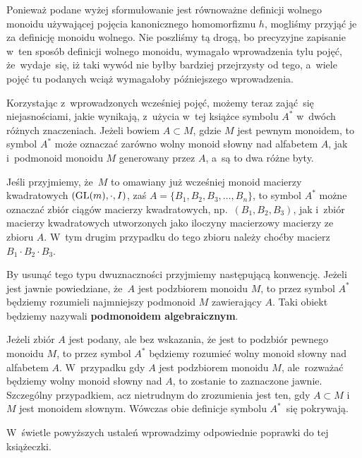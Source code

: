 \documentclass[a4paper,11pt]{article}
\begin{document}
Ponieważ podane wyżej sformułowanie jest równoważne definicji wolnego
monoidu używającej pojęcia kanonicznego homomorfizmu $h$, mogliśmy przyjąć
je za definicję monoidu wolnego. Nie poszliśmy tą drogą, bo precyzyjne
zapisanie w~ten sposób definicji wolnego monoidu, wymagało wprowadzenia
tylu pojęć, że~wydaje~się, iż taki wywód nie byłby bardziej przejrzysty od
tego, a~wiele pojęć tu podanych wciąż wymagałoby późniejszego wprowadzenia.

\vspace{\spaceFour}





\start {} Korzystając z~wprowadzonych wcześniej pojęć, możemy
teraz zająć~się niejasnościami, jakie wynikają, z~użycia w~tej książce
symbolu $A^{ * }$ w~dwóch różnych znaczeniach. Jeżeli bowiem
$A \subset M$, gdzie $M$ jest pewnym monoidem, to symbol $A^{ * }$
może oznaczać zarówno wolny monoid słowny nad alfabetem $A$, jak
i~podmonoid monoidu $M$ generowany przez $A$, a~są to dwa różne
byty.

Jeśli przyjmiemy, że~$M$ to omawiany już wcześniej monoid macierzy
kwadratowych $( \mathrm{GL}( m ), \cdot, I )$, zaś
$A = \{ B_{ 1 }, B_{ 2 }, B_{ 3 }, \ldots, B_{ n } \}$, to symbol
$A^{ * }$ możne oznaczać zbiór ciągów macierzy kwadratowych,
np.~$( B_{ 1 }, B_{ 2 }, B_{ 3 } )$, jak i~zbiór macierzy kwadratowych
utworzonych jako iloczyny macierzowy macierzy ze zbioru $A$. W~tym
drugim przypadku do tego zbioru należy choćby macierz
$B_{ 1 } \cdot B_{ 2 } \cdot B_{ 3 }$.

By usunąć tego typu dwuznaczności przyjmiemy następującą konwencję.
Jeżeli jest jawnie powiedziane, że~$A$ jest podzbiorem monoidu $M$, to
przez symbol $A^{ * }$ będziemy rozumieli najmniejszy podmonoid $M$
zawierający $A$. Taki obiekt będziemy nazywali \textbf{podmonoidem
  algebraicznym}.

Jeżeli zbiór $A$ jest podany, ale bez wskazania, że
jest to podzbiór pewnego monoidu $M$, to przez symbol $A^{ * }$
będziemy rozumieć wolny monoid słowny nad alfabetem $A$. W~przypadku
gdy $A$ jest podzbiorem monoidu $M$, ale~rozważać będziemy wolny
monoid słowny nad $A$, to zostanie to zaznaczone jawnie. Szczególny
przypadkiem, acz nietrudnym do zrozumienia jest ten, gdy $A \subset M$
i~$M$ jest monoidem słownym. Wówczas obie definicje symbolu
$A^{ * }$~się pokrywają.

W~świetle powyższych ustaleń wprowadzimy odpowiednie poprawki do tej
książeczki.

\vspace{\spaceFour}
\end{document}
